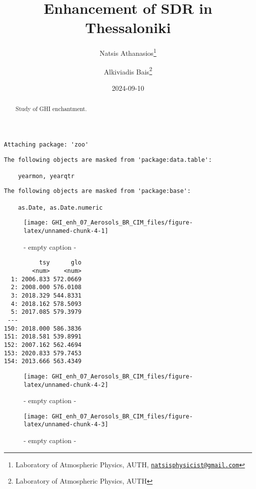 \documentclass[
  10pt,
  a4paper,oneside]{article}
\title{Enhancement of SDR in Thessaloniki}
\author{Natsis Athanasios\footnote{Laboratory of Atmospheric Physics, AUTH, \href{mailto:natsisphysicist@gmail.com}{\nolinkurl{natsisphysicist@gmail.com}}} \and Alkiviadis Bais\footnote{Laboratory of Atmospheric Physics, AUTH}}
\date{2024-09-10}
\begin{document}
\maketitle
\begin{abstract}
Study of GHI enchantment.
\end{abstract}

{
\hypersetup{linkcolor=}
\setcounter{tocdepth}{4}
\tableofcontents
}
\begin{verbatim}
Attaching package: 'zoo'
\end{verbatim}

\begin{verbatim}
The following objects are masked from 'package:data.table':

    yearmon, yearqtr
\end{verbatim}

\begin{verbatim}
The following objects are masked from 'package:base':

    as.Date, as.Date.numeric
\end{verbatim}

\begin{figure}[H]

{\centering \texttt{[image: GHI\_enh\_07\_Aerosols\_BR\_CIM\_files/figure-latex/unnamed-chunk-4-1]} 

}

\caption{ - empty caption - }\label{fig:unnamed-chunk-4-1}
\end{figure}

\begin{verbatim}
          tsy      glo
        <num>    <num>
  1: 2006.833 572.0669
  2: 2008.000 576.0108
  3: 2018.329 544.8331
  4: 2018.162 578.5093
  5: 2017.085 579.3979
 ---                  
150: 2018.000 586.3836
151: 2018.581 539.8991
152: 2007.162 562.4694
153: 2020.833 579.7453
154: 2013.666 563.4349
\end{verbatim}

\begin{figure}[H]

{\centering \texttt{[image: GHI\_enh\_07\_Aerosols\_BR\_CIM\_files/figure-latex/unnamed-chunk-4-2]} 

}

\caption{ - empty caption - }\label{fig:unnamed-chunk-4-2}
\end{figure}
\begin{figure}[H]

{\centering \texttt{[image: GHI\_enh\_07\_Aerosols\_BR\_CIM\_files/figure-latex/unnamed-chunk-4-3]} 

}

\caption{ - empty caption - }\label{fig:unnamed-chunk-4-3}
\end{figure}
\end{document}
